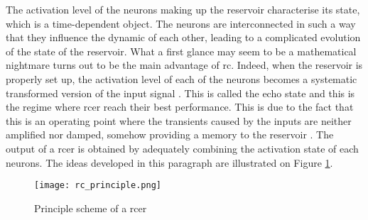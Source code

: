 The activation level of the neurons making up the reservoir characterise its state, which is a time-dependent object. The neurons are interconnected in such a way that they influence the dynamic of each other, leading to a complicated evolution of the state of the reservoir. What a first glance may seem to be a mathematical nightmare turns out to be the main advantage of \gls{rc}. Indeed, when the reservoir is properly set up, the activation level of each of the neurons becomes a systematic transformed version of the input signal \cite{Jaeger2004}. This is called the echo state and this is the regime where \gls{rcer} reach their best performance. This is due to the fact that this is an operating point where the transients caused by the inputs are neither amplified nor damped, somehow providing a memory to the reservoir \cite{Goudarzi2014ACS, JaegerH.2001Tesa}. The output of a \gls{rcer} is obtained by adequately combining the activation state of each neurons. The ideas developed in this paragraph are illustrated on Figure \ref{rc_principle}.\\

\begin{figure}[h]
	\centering
	\texttt{[image: rc\_principle.png]}
	\caption{Principle scheme of a \acrlong{rcer} \cite{financialTimeSeries}}
	\label{rc_principle}
\end{figure}

